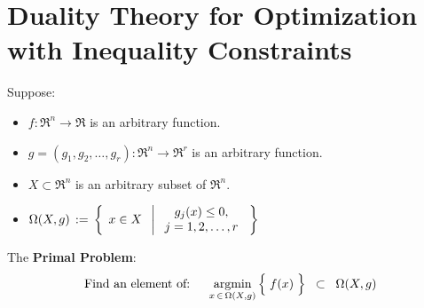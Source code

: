 

\section{Duality Theory for Optimization with Inequality Constraints}
\setcounter{theorem}{0}
\setcounter{equation}{0}


\renewcommand{\theenumi}{\roman{enumi}}
\renewcommand{\labelenumi}{\textnormal{(\theenumi)}$\;\;$}


\noindent
\begin{definition}
\mbox{}
\vskip 0.1cm
\noindent
Suppose:
\begin{itemize}
\item
	$f : \Re^{n} \longrightarrow \Re$ is an arbitrary function.
\item
	$g = (g_{1},g_{2},\ldots,g_{r}) : \Re^{n} \longrightarrow \Re^{r}$ is an arbitrary function.
\item
	$X \subset \Re^{n}$ is an arbitrary subset of $\Re^{n}$.
\item
	$\Omega(X,g) \, := \,
	\left\{\;\,
	x \overset{{\color{white}.}}{\in} X
	\;\;\left\vert\;
		\begin{array}{c}
			g_{j}(x) \leq 0,
			\\
			j = 1,2,\ldots,r
		\end{array}
		\right.
	\;\right\}$
\end{itemize}
The \textbf{Primal Problem}:
\begin{equation*}
\textnormal{Find an element of:}
\quad\;\;
\underset{x\,\in\,\Omega(X,g)}{\argmin}\left\{\;
	\overset{{\color{white}.}}{f(x)}
	\;\right\}
\;\; \subset \;\;
	\Omega(X,g)
\end{equation*}
\end{definition}


